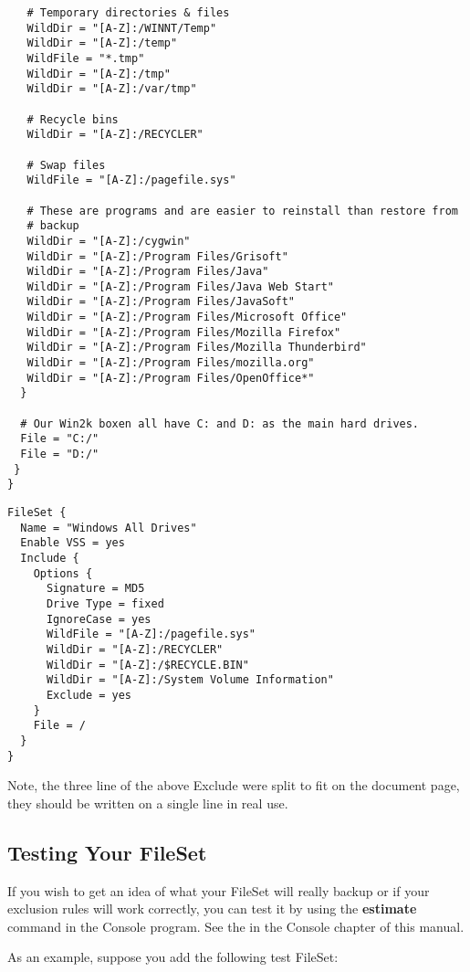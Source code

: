 \begin{verbatim}
   # Temporary directories & files
   WildDir = "[A-Z]:/WINNT/Temp"
   WildDir = "[A-Z]:/temp"
   WildFile = "*.tmp"
   WildDir = "[A-Z]:/tmp"
   WildDir = "[A-Z]:/var/tmp"

   # Recycle bins
   WildDir = "[A-Z]:/RECYCLER"

   # Swap files
   WildFile = "[A-Z]:/pagefile.sys"

   # These are programs and are easier to reinstall than restore from
   # backup
   WildDir = "[A-Z]:/cygwin"
   WildDir = "[A-Z]:/Program Files/Grisoft"
   WildDir = "[A-Z]:/Program Files/Java"
   WildDir = "[A-Z]:/Program Files/Java Web Start"
   WildDir = "[A-Z]:/Program Files/JavaSoft"
   WildDir = "[A-Z]:/Program Files/Microsoft Office"
   WildDir = "[A-Z]:/Program Files/Mozilla Firefox"
   WildDir = "[A-Z]:/Program Files/Mozilla Thunderbird"
   WildDir = "[A-Z]:/Program Files/mozilla.org"
   WildDir = "[A-Z]:/Program Files/OpenOffice*"
  }

  # Our Win2k boxen all have C: and D: as the main hard drives.
  File = "C:/"
  File = "D:/"
 }
}
\end{verbatim}
\normalsize

\begin{verbatim}
FileSet {
  Name = "Windows All Drives"
  Enable VSS = yes
  Include {
    Options {
      Signature = MD5
      Drive Type = fixed
      IgnoreCase = yes
      WildFile = "[A-Z]:/pagefile.sys"
      WildDir = "[A-Z]:/RECYCLER"
      WildDir = "[A-Z]:/$RECYCLE.BIN"
      WildDir = "[A-Z]:/System Volume Information"
      Exclude = yes
    }
    File = /
  }
}
\end{verbatim}


Note, the three line of the above Exclude were split to fit on the document
page, they should be written on a single line in real use.


\subsection{Testing Your FileSet}

If you wish to get an idea of what your FileSet will really backup or if your
exclusion rules will work correctly, you can test it by using the
{\bf estimate} command in the Console program. See the
 in the Console chapter of this
manual.

As an example, suppose you add the following test FileSet:

